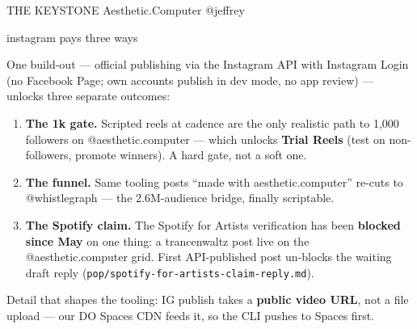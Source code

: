 \documentclass[12pt]{article}
\makeatletter
\newcommand{\ac}{Aesthetic\textcolor{acpink}{.}Computer}
\newenvironment{slide}[2]{%
  \clearpage
  {\footnotesize\color{acgray}\MakeUppercase{#1}\hfill}%
  {\footnotesize\color{acgray}\ac{} \textperiodcentered{} @jeffrey}\par
  \vspace{0.1em}
  {\acbold\fontsize{31pt}{35pt}\selectfont\color{acdark}#2\par}
  \vspace{0.9em}
  \large
}{%
  \vfill
  {\hfill\footnotesize\color{acgray}\thepage}%
}
\makeatother
\begin{document}
\begin{slide}{the keystone}{instagram pays three ways}
One build-out --- official publishing via the Instagram API with Instagram Login
(no Facebook Page; own accounts publish in dev mode, no app review) --- unlocks three
separate outcomes:

\vspace{1.1em}
\begin{enumerate}[leftmargin=2.2em, itemsep=0.7em]
  \item \textbf{The 1k gate.} Scripted reels at cadence are the only realistic path to
        1{,}000 followers on @aesthetic.computer --- which unlocks \textbf{Trial Reels}
        (test on non-followers, promote winners). A hard gate, not a soft one.
  \item \textbf{The funnel.} Same tooling posts ``made with aesthetic.computer''
        re-cuts to @whistlegraph --- the 2.6M-audience bridge, finally scriptable.
  \item \textbf{The Spotify claim.} The Spotify for Artists verification has been
        \textbf{blocked since May} on one thing: a trancenwaltz post live on the
        @aesthetic.computer grid. First API-published post un-blocks the waiting
        draft reply (\texttt{pop/spotify-for-artists-claim-reply.md}).
\end{enumerate}

\vspace{1.1em}
Detail that shapes the tooling: IG publish takes a \textbf{public video URL}, not a file
upload --- our DO Spaces CDN feeds it, so the CLI pushes to Spaces first.
\end{slide}
\end{document}
